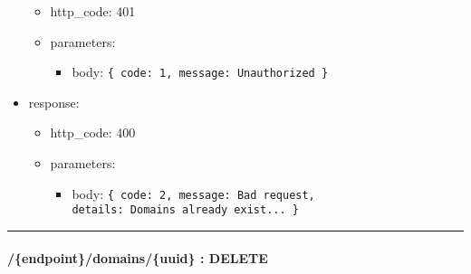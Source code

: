 \documentclass[
]{article}
\begin{document}
\begin{itemize}
  \begin{itemize}
  \item
    http\_code: 401
  \item
    parameters:

    \begin{itemize}
    \item
      body: \texttt{\{
      \textquotesingle{}code\textquotesingle{}:\ 1,\ 
      \textquotesingle{}message\textquotesingle{}:\ \textquotesingle{}Unauthorized\textquotesingle{}
      \}}
    \end{itemize}
  \end{itemize}
\item
  response:

  \begin{itemize}
  \item
    http\_code: 400
  \item
    parameters:

    \begin{itemize}
    \item
      body: \texttt{\{
      \textquotesingle{}code\textquotesingle{}:\ 2,
      \textquotesingle{}message\textquotesingle{}:\ \textquotesingle{}Bad\ request\textquotesingle{},
      \textquotesingle{}details\textquotesingle{}:\ \textquotesingle{}Domains\ already\ exist...\textquotesingle{}
      \}}
    \end{itemize}
  \end{itemize}
\end{itemize}

\begin{center}\rule{0.5\linewidth}{0.5pt}\end{center}

\hypertarget{header-n61129}{%
\paragraph{/\{endpoint\}/domains/\{uuid\} :
DELETE}\label{header-n61129}}
\end{document}
